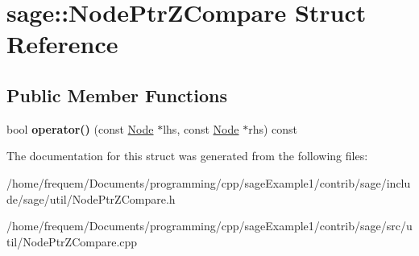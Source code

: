 \hypertarget{structsage_1_1NodePtrZCompare}{}\section{sage\+::Node\+Ptr\+Z\+Compare Struct Reference}
\label{structsage_1_1NodePtrZCompare}
\subsection*{Public Member Functions}
\begin{DoxyCompactItemize}
\item 
\mbox{\label{structsage_1_1NodePtrZCompare_a8547abb7726db5f78eb812d3ec82c7eb}} 
bool {\bfseries operator()} (const \mbox{\hyperlink{classsage_1_1Node}{Node}} $\ast$lhs, const \mbox{\hyperlink{classsage_1_1Node}{Node}} $\ast$rhs) const
\end{DoxyCompactItemize}


The documentation for this struct was generated from the following files\+:\begin{DoxyCompactItemize}
\item 
/home/frequem/\+Documents/programming/cpp/sage\+Example1/contrib/sage/include/sage/util/Node\+Ptr\+Z\+Compare.\+h\item 
/home/frequem/\+Documents/programming/cpp/sage\+Example1/contrib/sage/src/util/Node\+Ptr\+Z\+Compare.\+cpp\end{DoxyCompactItemize}
